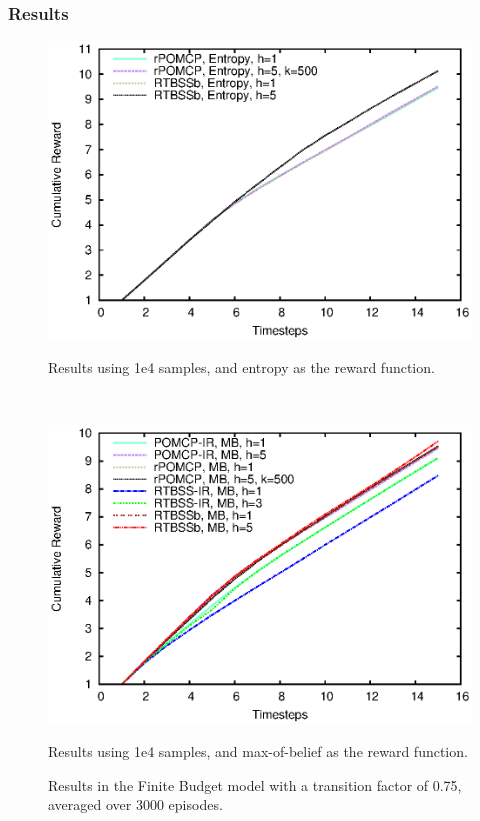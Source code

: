\documentclass[xcolor={dvipsnames}]{beamer}
\begin{document}
\begin{frame}
    \frametitle{Results}

\begin{figure}[ht!]
        \centering
        \begin{minipage}[t]{0.45\textwidth}
                \includegraphics[width=\textwidth]{../images/Images/FiniteBudgetResults/0.75/1e4/E/output}
                \caption{Results using 1e4 samples, and entropy as the reward function.}
                \label{fig:fb4e75}
        \end{minipage}%
        ~ %
        \begin{minipage}[t]{0.45\textwidth}
                \includegraphics[width=\textwidth]{../images/Images/FiniteBudgetResults/0.75/1e4/MB/output}
                \caption{Results using 1e4 samples, and max-of-belief as the reward function.}
                \label{fig:fb5e75}
        \end{minipage}
        \caption{Results in the Finite Budget model with a transition factor of 0.75, averaged over 3000 episodes.}
        \label{ref:fbentropyfig75}
\end{figure}
\end{frame}
\end{document}
